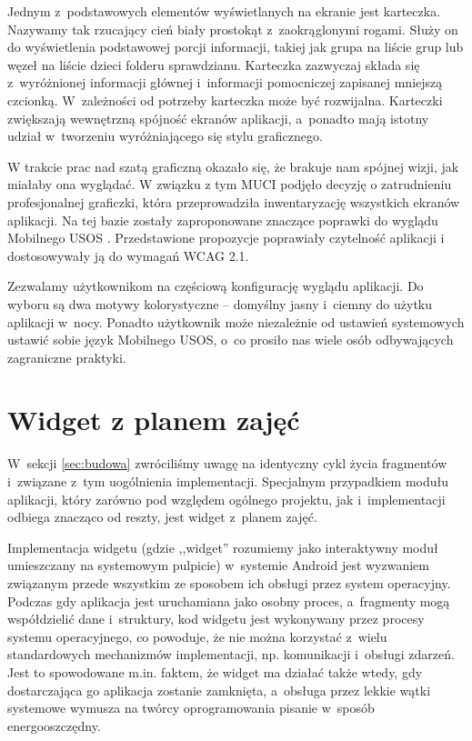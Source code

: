 \documentclass{pracamgr}
\begin{document}
Jednym z~podstawowych elementów wyświetlanych na ekranie jest karteczka. Nazywamy
tak rzucający cień biały prostokąt z~zaokrąglonymi rogami. Służy on do wyświetlenia
podstawowej porcji informacji, takiej jak grupa na liście grup lub węzeł na liście
dzieci folderu sprawdzianu. Karteczka zazwyczaj składa się z~wyróżnionej informacji
głównej i~informacji pomocniczej zapisanej mniejszą czcionką. W~zależności od potrzeby
karteczka może być rozwijalna. Karteczki zwiększają wewnętrzną spójność ekranów aplikacji,
a~ponadto mają istotny udział w~tworzeniu wyróżniającego się stylu graficznego.

W trakcie prac nad szatą graficzną okazało się, że brakuje nam spójnej wizji, jak
miałaby ona wyglądać. W związku z tym MUCI podjęło decyzję o zatrudnieniu profesjonalnej
graficzki, która przeprowadziła inwentaryzację wszystkich ekranów aplikacji. Na tej
bazie zostały zaproponowane znaczące poprawki do wyglądu Mobilnego USOS \cite{propozycjaszaty}.
Przedstawione propozycje poprawiały czytelność aplikacji i dostosowywały ją do
wymagań WCAG 2.1.

Zezwalamy użytkownikom na częściową konfigurację wyglądu aplikacji. Do wyboru są
dwa motywy kolorystyczne -- domyślny jasny i~ciemny do użytku aplikacji w~nocy.
Ponadto użytkownik może niezależnie od ustawień systemowych ustawić sobie język
Mobilnego USOS, o~co prosiło nas wiele osób odbywających zagraniczne praktyki.

\section{Widget z planem zajęć}

W~sekcji \ref{sec:budowa} zwróciliśmy uwagę na identyczny cykl życia
fragmentów i~związane z~tym uogólnienia implementacji. Specjalnym przypadkiem modułu
aplikacji, który zarówno pod względem ogólnego projektu, jak i~implementacji odbiega
znacząco od reszty, jest widget z~planem zajęć.

Implementacja widgetu (gdzie ,,widget'' rozumiemy jako interaktywny moduł umieszczany
na systemowym pulpicie) w~systemie Android jest wyzwaniem związanym przede wszystkim
ze sposobem ich obsługi przez system operacyjny. Podczas gdy aplikacja jest uruchamiana
jako osobny proces, a~fragmenty mogą współdzielić dane i~struktury, kod widgetu jest
wykonywany przez procesy systemu operacyjnego, co powoduje, że nie można korzystać
z~wielu standardowych mechanizmów implementacji, np. komunikacji i~obsługi zdarzeń.
Jest to spowodowane m.in. faktem, że widget ma działać także wtedy, gdy dostarczająca go
aplikacja zostanie zamknięta, a~obsługa przez lekkie wątki systemowe wymusza na twórcy
oprogramowania pisanie w~sposób energooszczędny.
\end{document}
